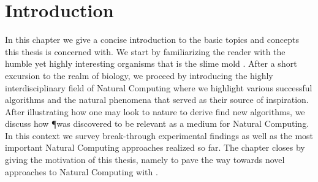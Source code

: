 \chapter{Introduction}

In this chapter we give a concise introduction to the basic topics and concepts this thesis is concerned with. We start by familiarizing the reader with the humble yet highly interesting organisms that is the slime mold \Pp. After a short excursion to the realm of biology, we proceed by introducing the highly interdisciplinary field of Natural Computing where we highlight various successful algorithms and the natural phenomena that served as their source of inspiration. After illustrating how one may look to nature to derive find new algorithms, we discuss how \P was discovered to be relevant as a medium for Natural Computing. In this context we survey break-through experimental findings as well as the most important Natural Computing approaches realized so far. The chapter closes by giving the motivation of this thesis, namely to pave the way towards novel approaches to Natural Computing with \Pp.







